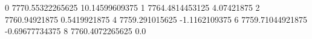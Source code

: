 0 7770.55322265625 10.14599609375
1 7764.4814453125 4.07421875
2 7760.94921875 0.5419921875
4 7759.291015625 -1.1162109375
6 7759.71044921875 -0.69677734375
8 7760.4072265625 0.0
